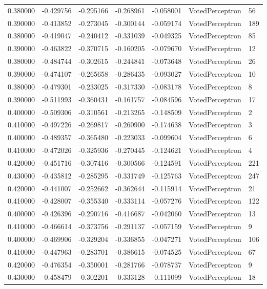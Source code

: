 \begin{tabular}{rrrrrll}
0.380000 & -0.429756 & -0.295166 & -0.268961 & -0.058001 & VotedPerceptron & 56 \\
0.390000 & -0.413852 & -0.273045 & -0.300144 & -0.059174 & VotedPerceptron & 189 \\
0.380000 & -0.419047 & -0.240412 & -0.331039 & -0.049325 & VotedPerceptron & 85 \\
0.390000 & -0.463822 & -0.370715 & -0.160205 & -0.079670 & VotedPerceptron & 12 \\
0.380000 & -0.484744 & -0.302615 & -0.244841 & -0.073648 & VotedPerceptron & 26 \\
0.390000 & -0.474107 & -0.265658 & -0.286435 & -0.093027 & VotedPerceptron & 10 \\
0.380000 & -0.479301 & -0.233025 & -0.317330 & -0.083178 & VotedPerceptron & 8 \\
0.390000 & -0.511993 & -0.360431 & -0.161757 & -0.084596 & VotedPerceptron & 17 \\
0.400000 & -0.509306 & -0.310561 & -0.213265 & -0.148509 & VotedPerceptron & 2 \\
0.410000 & -0.497226 & -0.269817 & -0.260900 & -0.174638 & VotedPerceptron & 3 \\
0.400000 & -0.489357 & -0.365480 & -0.223033 & -0.099604 & VotedPerceptron & 6 \\
0.410000 & -0.472026 & -0.325936 & -0.270445 & -0.124621 & VotedPerceptron & 4 \\
0.420000 & -0.451716 & -0.307416 & -0.300566 & -0.124591 & VotedPerceptron & 221 \\
0.430000 & -0.435812 & -0.285295 & -0.331749 & -0.125763 & VotedPerceptron & 247 \\
0.420000 & -0.441007 & -0.252662 & -0.362644 & -0.115914 & VotedPerceptron & 21 \\
0.410000 & -0.428007 & -0.355340 & -0.333114 & -0.057276 & VotedPerceptron & 122 \\
0.400000 & -0.426396 & -0.290716 & -0.416687 & -0.042060 & VotedPerceptron & 13 \\
0.410000 & -0.466614 & -0.373756 & -0.291137 & -0.057159 & VotedPerceptron & 9 \\
0.400000 & -0.469906 & -0.329204 & -0.336855 & -0.047271 & VotedPerceptron & 106 \\
0.410000 & -0.447963 & -0.283701 & -0.386615 & -0.074525 & VotedPerceptron & 67 \\
0.420000 & -0.476354 & -0.350001 & -0.281766 & -0.078737 & VotedPerceptron & 9 \\
0.430000 & -0.458479 & -0.302201 & -0.333128 & -0.111099 & VotedPerceptron & 18 \\

\end{tabular}
